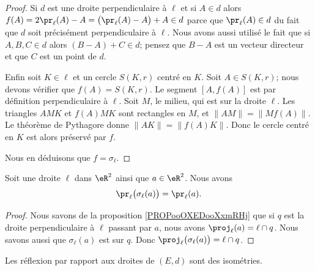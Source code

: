 \begin{proof}
	Si \( d\) est une droite perpendiculaire à \( \ell\) et si \( A\in d\) alors \( f(A)=2\pr_{\ell}(A)-A=  \big( \pr_{\ell}(A)-A \big)+A\in d  \) parce que \( \pr_{\ell}(A)\in d\) du fait que \( d\) soit précisément perpendiculaire à \( \ell\). Nous avons aussi utilisé le fait que si \( A,B,C\in d\) alors \( (B-A)+C\in d\); pensez que \( B-A\) est un vecteur directeur et que \( C\) est un point de \( d\).

	Enfin soit \( K\in\ell\) et un cercle \( S(K,r)\) centré en \( K\). Soit \( A\in S(K,r)\); nous devons vérifier que \( f(A)=S(K,r)\). Le segment \( [A,f(A)]\) est par définition perpendiculaire à \( \ell\). Soit \( M\), le milieu, qui est sur la droite \( \ell\). Les triangles \( AMK\) et \( f(A)MK\) sont rectangles en \( M\), et \( \| AM \|=\| Mf(A) \|\). Le théorème de Pythagore donne \( \| AK \|=\| f(A)K \|\). Donc le cercle centré en \( K\) est alors préservé par \( f\).

	Nous en déduisons que \( f=\sigma_{\ell}\).
\end{proof}

\begin{lemma}       \label{LEMooNYIWooXanBXh}
	Soit une droite \( \ell\) dans \( \eR^2\) ainsi que \( a\in \eR^2\). Nous avons
	\begin{equation}
		\pr_{\ell}\big( \sigma_{\ell}(a) \big)=\pr_{\ell}(a).
	\end{equation}
\end{lemma}

\begin{proof}
	Nous savons de la proposition \ref{PROPooOXEDooXxmRHj} que si \( q\) est la droite perpendiculaire à \( \ell\) passant par \( a\), nous avons \( \proj_{\ell}(a)=\ell\cap q\). Nous savons aussi que \( \sigma_{\ell}(a)\) est sur \( q\). Donc \( \proj_{\ell}\big( \sigma_{\ell}(a) \big)=\ell\cap q\).
\end{proof}

\begin{proposition}      \label{PROPooFSVEooWmJsnv}
	Les réflexion par rapport aux droites de \( (E,d)\) sont des isométries.
\end{proposition}

